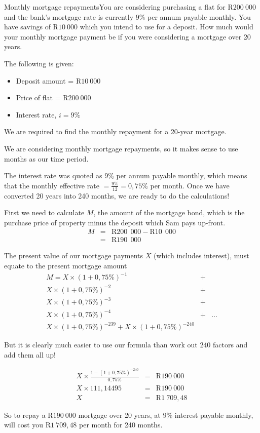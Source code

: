 \begin{wex}{Monthly mortgage repayments}{You are considering purchasing a flat for R$200~000$ and the bank's mortgage rate is currently $9\%$ per annum payable monthly. You have savings of R$10~000$ which you intend to use for a deposit. How much would your monthly mortgage payment be if you were considering a mortgage over 20 years.}{
The following is given:
\begin{itemize}
\item{Deposit amount = R$10~000$}
\item{Price of flat = R$200~000$}
\item{Interest rate, $i=9\%$}
\end{itemize}
We are required to find the monthly repayment for a 20-year mortgage.

We are considering monthly mortgage repayments, so it makes sense to use months as our time period.

The interest rate was quoted as $9\%$ per annum payable monthly, which means that the monthly effective rate $= \frac{9\%}{12} = 0,75\%$ per month. Once we have converted 20 years into 240 months, we are ready to do the calculations!

First we need to calculate $M$, the amount of the mortgage bond, which is the purchase price of property minus the deposit which Sam pays up-front.
\begin{eqnarray*}
M &=& \mbox{R}200\:~000 - \mbox{R}10\:~000\\
&=& \mbox{R}190\:~000
\end{eqnarray*}

The present value of our mortgage payments $X$ (which includes interest), must equate to the present mortgage amount
\begin{eqnarray*}
M = X\times (1 + 0,75\%)^{-1}&+& \\
X\times (1 + 0,75\%)^{-2}&+& \\
X\times (1 + 0,75\%)^{-3}&+& \\
X\times (1 + 0,75\%)^{-4} &+& \ldots \\
X\times (1 + 0,75\%)^{-239}+ X\times (1 + 0,75\%)^{-240}
\end{eqnarray*}

But it is clearly much easier to use our formula than work out $240$ factors and add them all up!

\begin{eqnarray*}
X \times \frac{1 - (1 + 0,75\%)^{-240}}{0,75\%} &=& \mbox{R}190~000\\
X \times 111,14495 &=& \mbox{R}190~000\\
X &=& \mbox{R}1~709,48
\end{eqnarray*}

So to repay a R$190~000$ mortgage over 20 years, at $9\%$ interest payable monthly, will cost you R$1~709,48$ per month for 240 months.}
\end{wex}

